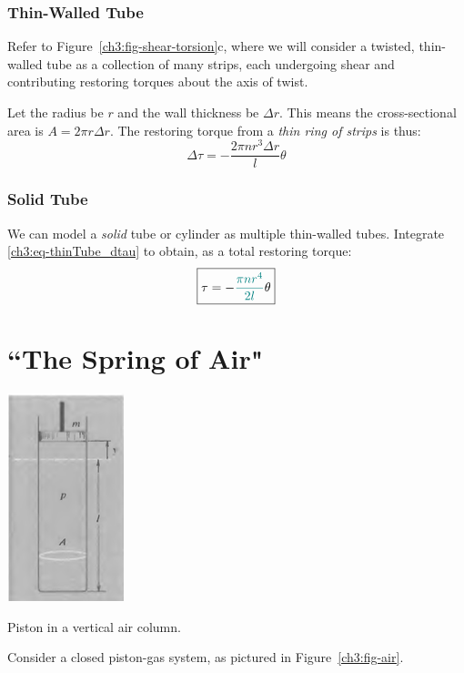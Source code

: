 \subsubsection{Thin-Walled Tube}
Refer to Figure~\ref{ch3:fig-shear-torsion}c, where we will consider a twisted, thin-walled tube as a collection of many strips, each undergoing shear and contributing restoring torques about the axis of twist.

Let the radius be $r$ and the wall thickness be $\Delta r$. This means the cross-sectional area is $A=2\pi r \Delta r$. The restoring torque from a \emph{thin ring of strips} is thus:
\begin{equation}
\Delta \tau = -\frac{2\pi nr^3\Delta r}{l} \theta  \label{ch3:eq-thinTube_dtau}
\end{equation}

\subsubsection{Solid Tube}
We can model a \textit{solid} tube or cylinder as multiple thin-walled tubes. Integrate \eqref{ch3:eq-thinTube_dtau} to obtain, as a total restoring torque:
\begin{equation*}
	\boxed{\tau = -\textcolor{teal}{\frac{\pi nr^4}{2l}} \theta}
\end{equation*}

\section{``The Spring of Air"} \label{ch3:sec-air}

\begin{marginfigure}
	\centering
	\includegraphics[scale=0.8]{phys232/Ch3-air.png}
	\caption{Piston in a vertical air column.}
	\label{ch3:fig-air}
\end{marginfigure}

Consider a closed piston-gas system, as pictured in Figure~\ref{ch3:fig-air}.

